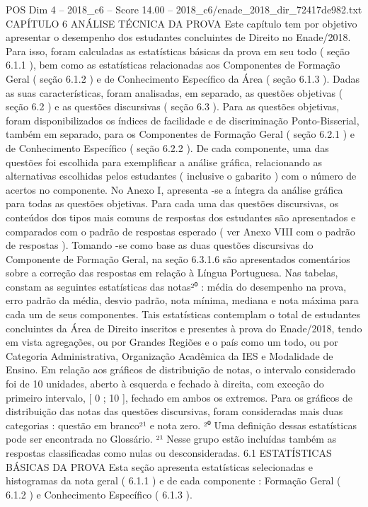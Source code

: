 \begin{textsample}{POS Dim 4 – 2018\_c6 – Score 14.00 – 2018\_c6/enade\_2018\_dir\_72417de982.txt}  \label{ex:f4_pos_004}
CAPÍTULO 6 ANÁLISE TÉCNICA DA PROVA Este capítulo tem por objetivo apresentar o desempenho dos estudantes concluintes de Direito no Enade/2018.
Para isso, foram calculadas as estatísticas básicas da prova em seu todo ( seção 6.1.1 ), bem como as estatísticas relacionadas aos Componentes de Formação Geral ( seção 6.1.2 ) e de Conhecimento Específico da Área ( seção 6.1.3 ).
Dadas as suas características, foram analisadas, em separado, as questões objetivas ( seção 6.2 ) e as questões discursivas ( seção 6.3 ).
Para as questões objetivas, foram disponibilizados os índices de facilidade e de discriminação Ponto-Bisserial, também em separado, para os Componentes de Formação Geral ( seção 6.2.1 ) e de Conhecimento Específico ( seção 6.2.2 ).
De cada componente, uma das questões foi escolhida para exemplificar a análise gráfica, relacionando as alternativas escolhidas pelos estudantes ( inclusive o gabarito ) com o número de acertos no componente.
No Anexo I, apresenta -se a íntegra da análise gráfica para todas as questões objetivas.
Para cada uma das questões discursivas, os conteúdos dos tipos mais comuns de respostas dos estudantes são apresentados e comparados com o padrão de respostas esperado ( ver Anexo VIII com o padrão de respostas ).
Tomando -se como base as duas questões discursivas do Componente de Formação Geral, na seção 6.3.1.6 são apresentados comentários sobre a correção das respostas em relação à Língua Portuguesa.
Nas tabelas, constam as seguintes estatísticas das notas²⁰ : média do desempenho na prova, erro padrão da média, desvio padrão, nota mínima, mediana e nota máxima para cada um de seus componentes.
Tais estatísticas contemplam o total de estudantes concluintes da Área de Direito inscritos e presentes à prova do Enade/2018, tendo em vista agregações, ou por Grandes Regiões e o país como um todo, ou por Categoria Administrativa, Organização Acadêmica da IES e Modalidade de Ensino.
Em relação aos gráficos de distribuição de notas, o intervalo considerado foi de 10 unidades, aberto à esquerda e fechado à direita, com exceção do primeiro intervalo, [ 0 ; 10 ], fechado em ambos os extremos.
Para os gráficos de distribuição das notas das questões discursivas, foram consideradas mais duas categorias : questão em branco²¹ e nota zero. ²⁰ Uma definição dessas estatísticas pode ser encontrada no Glossário. ²¹ Nesse grupo estão incluídas também as respostas classificadas como nulas ou desconsideradas. 6.1 ESTATÍSTICAS BÁSICAS DA PROVA Esta seção apresenta estatísticas selecionadas e histogramas da nota geral ( 6.1.1 ) e de cada componente : Formação Geral ( 6.1.2 ) e Conhecimento Específico ( 6.1.3 ).

\end{textsample}
